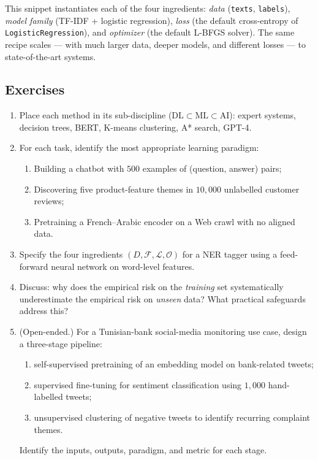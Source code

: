 This snippet instantiates each of the four ingredients: \emph{data} (\texttt{texts}, \texttt{labels}), \emph{model family} (TF-IDF + logistic regression), \emph{loss} (the default cross-entropy of \texttt{LogisticRegression}), and \emph{optimizer} (the default L-BFGS solver). The same recipe scales --- with much larger data, deeper models, and different losses --- to state-of-the-art systems.

\subsection{Exercises}
\begin{enumerate}
    \item Place each method in its sub-discipline ($\mathrm{DL} \subset \mathrm{ML} \subset \mathrm{AI}$): expert systems, decision trees, BERT, K-means clustering, A* search, GPT-4.
    \item For each task, identify the most appropriate learning paradigm:
    \begin{enumerate}
        \item Building a chatbot with $500$ examples of (question, answer) pairs;
        \item Discovering five product-feature themes in $10{,}000$ unlabelled customer reviews;
        \item Pretraining a French--Arabic encoder on a Web crawl with no aligned data.
    \end{enumerate}
    \item Specify the four ingredients $(D, \mathcal{F}, \mathcal{L}, \mathcal{O})$ for a NER tagger using a feed-forward neural network on word-level features.
    \item Discuss: why does the empirical risk on the \emph{training} set systematically underestimate the empirical risk on \emph{unseen} data? What practical safeguards address this?
    \item (Open-ended.) For a Tunisian-bank social-media monitoring use case, design a three-stage pipeline:
    \begin{enumerate}
        \item self-supervised pretraining of an embedding model on bank-related tweets;
        \item supervised fine-tuning for sentiment classification using $1{,}000$ hand-labelled tweets;
        \item unsupervised clustering of negative tweets to identify recurring complaint themes.
    \end{enumerate}
    Identify the inputs, outputs, paradigm, and metric for each stage.
\end{enumerate}


